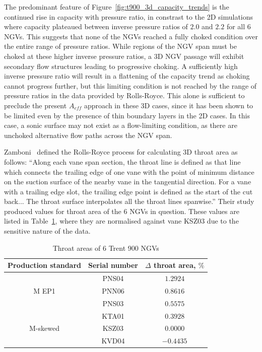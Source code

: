 \documentclass[a4paper, 11pt, oneside]{report}
\begin{document}
The predominant feature of Figure~\ref{fig:t900_3d_capacity_trends} is the continued rise in capacity with pressure ratio, in constrast to the 2D simulations where capacity plateaued between inverse pressure ratios of $2.0$ and $2.2$ for all $6$ NGVs. This suggests that none of the NGVs reached a fully choked condition over the entire range of pressure ratios. While regions of the NGV span must be choked at these higher inverse pressure ratios, a 3D NGV passage will exhibit secondary flow structures leading to progressive choking. A sufficiently high inverse pressure ratio will result in a flattening of the capacity trend as choking cannot progress further, but this limiting condition is not reached by the range of pressure ratios in the data provided by Rolls-Royce. This alone is sufficient to preclude the present $A_{eff}$ approach in these 3D cases, since it has been shown to be limited even by the presence of thin boundary layers in the 2D cases. In this case, a sonic surface may not exist as a flow-limiting condition, as there are unchoked alternative flow paths across the NGV span.

Zamboni~\cite{zamboni_area} defined the Rolls-Royce process for calculating 3D throat area as follows: ``Along each vane span section, the throat line is defined as that line which connects the trailing edge of one vane with the point of minimum distance on the suction surface of the nearby vane in the tangential direction. For a vane with a trailing edge slot, the trailing edge point is defined as the start of the cut back... The throat surface interpolates all the throat lines spanwise.'' Their study produced values for throat area of the 6 NGVs in question. These values are listed in Table~\ref{T900_throat_areas}, where they are normalised against vane KSZ03 due to the sensitive nature of the data.

\begin{table}[H]
\caption{Throat areas of 6 Trent 900 NGVs}
\label{T900_throat_areas}
\begin{center}
\begin{tabular}{|c|c|c|}
\hline
Production standard & Serial number & $\Delta$ throat area, $\%$\\
\hline
\multirow{3}{*}{M EP1} & PNS04 & $1.2924$\\
 & PNN06 & $0.8616$\\
 & PNS03 & $0.5575$\\
 \hline
 \multirow{3}{*}{M-skewed} & KTA01 & $0.3928$\\
 & KSZ03 & $0.0000$\\
 & KVD04 & $-0.4435$\\
\hline
\end{tabular}
\end{center}
\end{table}
\end{document}
